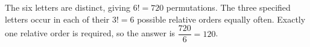 The six letters are distinct, giving $6!=720$ permutations. The three specified letters occur in each of their $3!=6$ possible relative orders equally often. Exactly one relative order is required, so the answer is $\dfrac{720}{6}=\boxed{120}$.
